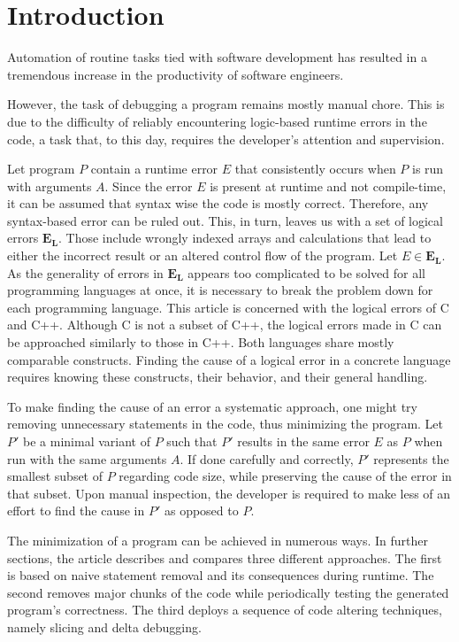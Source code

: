 \chapter*{Introduction}


Automation of routine tasks tied with software development has resulted in a tremendous
increase in the productivity of software engineers. 

However, the task of debugging a program
remains mostly manual chore. 
This is due to the difficulty of reliably encountering logic-based
runtime errors in the code, a task that, to this day, requires 
the developer's attention and supervision.

Let program $P$ contain a runtime error $E$ that consistently occurs
when $P$ is run with arguments $A$.
Since the error $E$ is present at runtime and not compile-time,
it can be assumed that syntax wise the code is mostly correct.
Therefore, any syntax-based error can be ruled out.
This, in turn, leaves us with a set of logical errors $\mathbf{E_L}$.
Those include wrongly indexed arrays and calculations that lead to either
the incorrect result or an altered control flow of the program. 
Let $E \in \mathbf{E_L}$. As the generality of errors in $\mathbf{E_L}$ appears
too complicated to be solved for all programming languages at once, it is necessary to 
break the problem down for each programming language. 
This article is concerned with the logical errors of C and C++.
Although C is not a subset of C++, the logical errors made in C can be
approached similarly to those in C++.
Both languages share mostly comparable constructs.
Finding the cause of a logical error in a concrete language requires knowing
these constructs, their behavior, and their general handling.

To make finding the cause of an error a systematic approach, one might try removing
unnecessary statements in the code, thus minimizing the program.
Let $P'$ be a minimal variant of $P$ such that $P'$ results in the same error $E$ as $P$
when run with the same arguments $A$.
If done carefully and correctly, $P'$ represents the smallest subset of $P$ regarding code
size, while preserving the cause of the error in that subset.
Upon manual inspection, the developer is required to make less of an effort to find
the cause in $P'$ as opposed to $P$.

The minimization of a program can be achieved in numerous ways.
In further sections, the article describes and compares three different approaches.
The first is based on naive statement removal and its consequences during runtime.
The second removes major chunks of the code while
periodically testing the generated program's correctness.
The third deploys a sequence of code
altering techniques, namely slicing and delta debugging.

